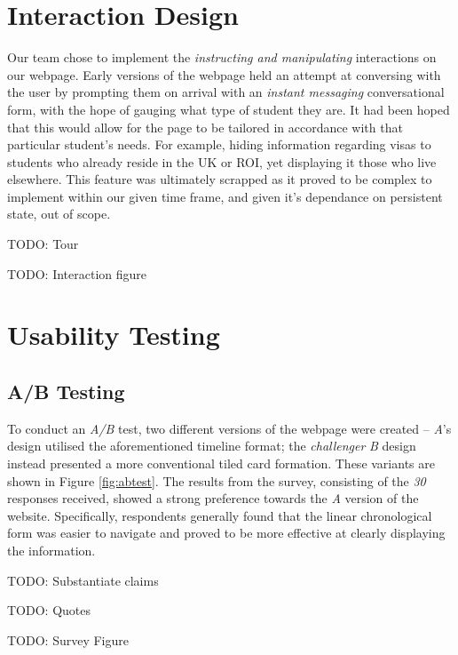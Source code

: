 \documentclass[a4paper, notoc]{tufte-handout}
\begin{document}
\section{Interaction Design}\label{label:interaction-design}

Our team chose to implement the \textit{instructing and manipulating} interactions on our webpage. Early versions of the webpage held an attempt at conversing with the user by prompting them on arrival with an \textit{instant messaging} conversational form, with the hope of gauging what type of student they are. It had been hoped that this would allow for the page to be tailored in accordance with that particular student's needs. For example, hiding information regarding visas to students who already reside in the UK or ROI, yet displaying it those who live elsewhere. This feature was ultimately scrapped as it proved to be complex to implement within our given time frame, and given it's dependance on persistent state, out of scope.

TODO: Tour

TODO: Interaction figure


\section{Usability Testing}\label{sec:usability-testing}

\subsection{A/B Testing}\label{subsec:a-b-testing}

To conduct an \textit{A/B} test, two different versions of the webpage were created -- \textit{A}'s design utilised the aforementioned timeline format; the \textit{challenger} \textit{B} design instead presented a more conventional tiled card formation. These variants are shown in Figure \ref{fig:abtest}. The results from the survey, consisting of the \emph{30} responses received, showed a strong preference towards the \textit{A} version of the website. Specifically, respondents generally found that the linear chronological form was easier to navigate and proved to be more effective at clearly displaying the information.

TODO: Substantiate claims

TODO: Quotes

TODO: Survey Figure
\end{document}
